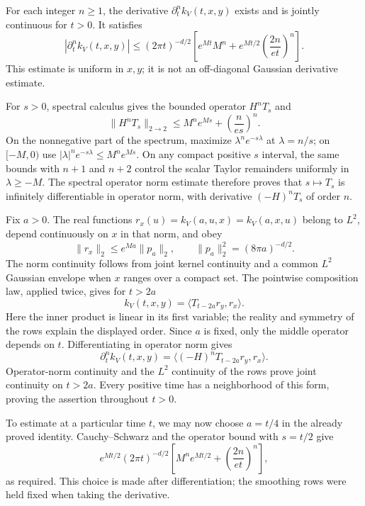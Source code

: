 \begin{proposition}
\label{prop:schrodinger_kernel_time_derivatives}
For each integer $n\geq1$, the derivative $\partial_t^n k_V(t,x,y)$
exists and is jointly continuous for $t>0$. It satisfies
\[
|\partial_t^n k_V(t,x,y)|
\leq(2\pi t)^{-d/2}
 \left[e^{Mt}M^n+e^{Mt/2}\left(\frac{2n}{et}\right)^n\right].
\]
This estimate is uniform in $x,y$; it is not an off-diagonal Gaussian
derivative estimate.
\end{proposition}
\Proof
For $s>0$, spectral calculus gives the bounded operator $H^nT_s$ and
\[
\|H^nT_s\|_{2\to2}
\leq M^n e^{Ms}+\left(\frac{n}{es}\right)^n.
\]
On the nonnegative part of the spectrum, maximize
$\lambda^n e^{-s\lambda}$ at $\lambda=n/s$; on $[-M,0)$ use
$|\lambda|^n e^{-s\lambda}\leq M^n e^{Ms}$. On any compact
positive $s$ interval, the same bounds with $n+1$ and $n+2$ control
the scalar Taylor remainders uniformly in $\lambda\geq-M$.
The spectral operator norm estimate therefore proves that $s\mapsto T_s$
is infinitely differentiable in operator norm, with derivative
$(-H)^nT_s$ of order $n$.

Fix $a>0$. The real functions
$r_x(u)=k_V(a,u,x)=k_V(a,x,u)$ belong to $L^2$, depend continuously
on $x$ in that norm, and obey
\[
\|r_x\|_2\leq e^{Ma}\|p_a\|_2,
\qquad \|p_a\|_2^2=(8\pi a)^{-d/2}.
\]
The norm continuity follows from joint kernel continuity and a common
$L^2$ Gaussian envelope when $x$ ranges over a compact set.
The pointwise composition law, applied twice, gives for $t>2a$
\[
k_V(t,x,y)=\langle T_{t-2a}r_y,r_x\rangle.
\]
Here the inner product is linear in its first variable; the reality
and symmetry of the rows explain the displayed order. Since $a$ is
fixed, only the middle operator depends on $t$. Differentiating in
operator norm gives
\[
\partial_t^n k_V(t,x,y)
=\langle(-H)^nT_{t-2a}r_y,r_x\rangle.
\]
Operator-norm continuity and the $L^2$ continuity of the rows prove
joint continuity on $t>2a$. Every positive time has a neighborhood
of this form, proving the assertion throughout $t>0$.

To estimate at a particular time $t$, we may now choose $a=t/4$
in the already proved identity. Cauchy--Schwarz and the operator
bound with $s=t/2$ give
\[
e^{Mt/2}(2\pi t)^{-d/2}
 \left[M^n e^{Mt/2}+\left(\frac{2n}{et}\right)^n\right],
\]
as required. This choice is made after differentiation; the smoothing
rows were held fixed when taking the derivative.
\Done

